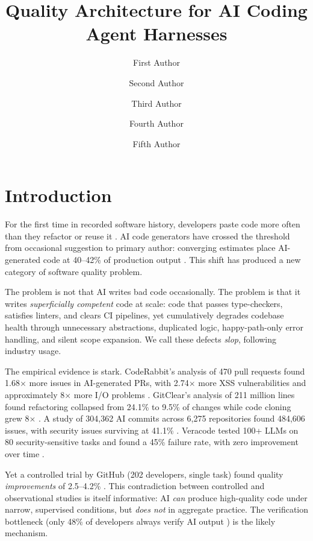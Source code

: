 \documentclass[11pt, a4paper, logo, copyright]{googledeepmind}
\title{Quality Architecture for AI Coding Agent Harnesses}
\author[1]{First Author}
\author[2]{Second Author}
\author[2]{Third Author}
\author[1]{Fourth Author}
\author[1]{Fifth Author}
\affil[]{Pragnition Labs}
\affil[*]{Equal Contribution}
\affil[1]{Affiliation 1}
\affil[2]{Affiliation 2}
\begin{document}
\maketitle

\section{Introduction}
\label{sec:intro}

For the first time in recorded software history, developers paste code more often than they refactor or reuse it \citep{gitclear2025}. AI code generators have crossed the threshold from occasional suggestion to primary author: converging estimates place AI-generated code at 40--42\% of production output \citep{gitclear2025, sonar2026}. This shift has produced a new category of software quality problem.

The problem is not that AI writes bad code occasionally. The problem is that it writes \emph{superficially competent} code at scale: code that passes type-checkers, satisfies linters, and clears CI pipelines, yet cumulatively degrades codebase health through unnecessary abstractions, duplicated logic, happy-path-only error handling, and silent scope expansion. We call these defects \emph{slop}, following industry usage.

The empirical evidence is stark. CodeRabbit's analysis of 470 pull requests found 1.68$\times$ more issues in AI-generated PRs, with 2.74$\times$ more XSS vulnerabilities and approximately 8$\times$ more I/O problems \citep{coderabbit2025}. GitClear's analysis of 211 million lines found refactoring collapsed from 24.1\% to 9.5\% of changes while code cloning grew 8$\times$ \citep{gitclear2025}. A study of 304,362 AI commits across 6,275 repositories found 484,606 issues, with security issues surviving at 41.1\% \citep{debtboom2026}. Veracode tested 100+ LLMs on 80 security-sensitive tasks and found a 45\% failure rate, with zero improvement over time \citep{veracode2025}.

Yet a controlled trial by GitHub (202 developers, single task) found quality \emph{improvements} of 2.5--4.2\% \citep{github2024rct}. This contradiction between controlled and observational studies is itself informative: AI \emph{can} produce high-quality code under narrow, supervised conditions, but \emph{does not} in aggregate practice. The verification bottleneck (only 48\% of developers always verify AI output \citep{sonar2026}) is the likely mechanism.
\end{document}
